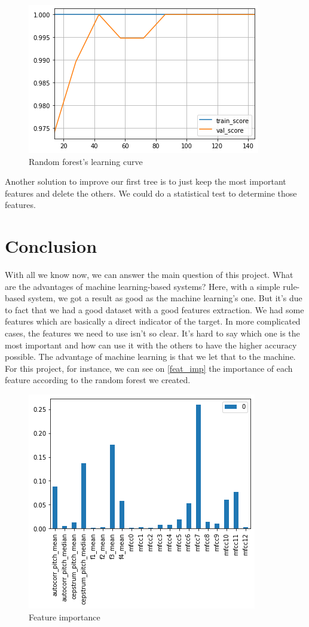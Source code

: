 \documentclass[]{article}
\begin{document}
\begin{figure}[H]
    \centering
    \caption{\label{learncurve2}Random forest's learning curve}
    \includegraphics[scale=0.5]{images/learncurve2.png}
\end{figure}

Another solution to improve our first tree is to just keep the most important features and
delete the others. We could do a statistical test to determine those features.

\section{Conclusion}


With all we know now, we can answer the main question of this project.
What are the advantages of machine learning-based systems? Here, with
a simple rule-based system, we got a result as good as the machine learning's one. 
But it's due to fact that we had a good dataset with a good features extraction.
We had some features which are basically a direct indicator of the target. In more
complicated cases, the features we need to use isn't so clear. It's hard to say which one
is the most important and how can use it with the others to have the higher accuracy possible.
The advantage of machine learning is that we let that to the machine. For this project, for instance,
we can see on \autoref{feat_imp} the importance of each feature according to the random forest we created.

\begin{figure}[H]
    \centering
    \caption{\label{feat_imp}Feature importance}
    \includegraphics[scale=0.7]{images/feat_imp.png}
\end{figure}
\end{document}
